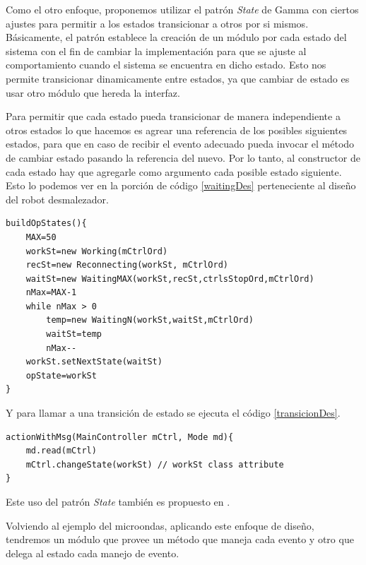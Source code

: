 Como el otro enfoque, proponemos utilizar el patrón \textit{State} de Gamma con ciertos ajustes para permitir a los estados transicionar a otros por si mismos. Básicamente, el patrón establece la creación de un módulo por cada estado del sistema con el fin de cambiar la implementación para que se ajuste al comportamiento cuando el sistema se encuentra en dicho estado. Esto nos permite transicionar dinamicamente entre estados, ya que cambiar de estado es usar otro módulo que hereda la interfaz.

Para permitir que cada estado pueda transicionar de manera independiente a otros estados lo que hacemos es agrear una referencia de los posibles siguientes estados, para que en caso de recibir el evento adecuado pueda invocar el método de cambiar estado pasando la referencia del nuevo. Por lo tanto, al constructor de cada estado hay que agregarle como argumento cada posible estado siguiente. Esto lo podemos ver en la porción de código \ref{waitingDes} perteneciente al diseño del robot desmalezador.

\begin{lstlisting}[label={waitingDes},caption=Código ejemplo transición robot desmalezador]
buildOpStates(){
    MAX=50
    workSt=new Working(mCtrlOrd)
    recSt=new Reconnecting(workSt, mCtrlOrd)
    waitSt=new WaitingMAX(workSt,recSt,ctrlsStopOrd,mCtrlOrd)
    nMax=MAX-1
    while nMax > 0
        temp=new WaitingN(workSt,waitSt,mCtrlOrd)
        waitSt=temp
        nMax--
    workSt.setNextState(waitSt)
    opState=workSt
}
\end{lstlisting}

Y para llamar a una transición de estado se ejecuta el código \ref{transicionDes}.
\begin{lstlisting}[label={transicionDes}, caption=Ejemplo transición de estado.]
actionWithMsg(MainController mCtrl, Mode md){
    md.read(mCtrl)
    mCtrl.changeState(workSt) // workSt class attribute
}
\end{lstlisting}

Este uso del patrón \textit{State} también es propuesto en \cite[\textit{Chapter 10 : Finite State Machine Patterns Part III: New Patterns as Design Components}]{douglass}.


Volviendo al ejemplo del microondas, aplicando este enfoque de diseño, tendremos un módulo que provee un método que maneja cada evento y otro que delega al estado cada manejo de evento.

